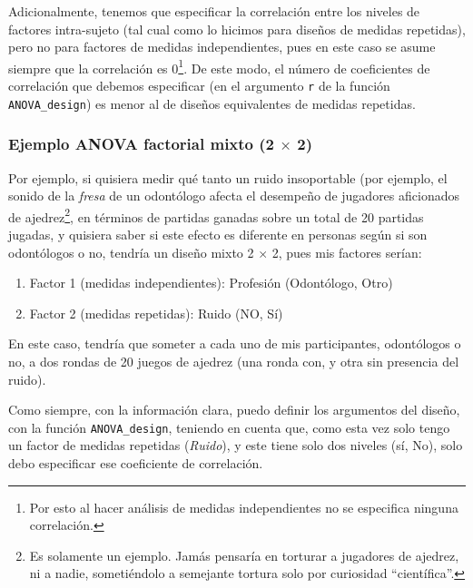 \documentclass[
]{article}
\providecommand{\tightlist}{%
  \setlength{\itemsep}{0pt}\setlength{\parskip}{0pt}}
\begin{document}
Adicionalmente, tenemos que especificar la correlación entre los niveles
de factores intra-sujeto (tal cual como lo hicimos para diseños de
medidas repetidas), pero no para factores de medidas independientes,
pues en este caso se asume siempre que la correlación es 0\footnote{Por
  esto al hacer análisis de medidas independientes no se especifica
  ninguna correlación.}. De este modo, el número de coeficientes de
correlación que debemos especificar (en el argumento \texttt{r} de la
función \texttt{ANOVA\_design}) es menor al de diseños equivalentes de
medidas repetidas.

\hypertarget{ejemplo-anova-factorial-mixto-2-times-2}{%
\subsubsection{\texorpdfstring{Ejemplo ANOVA factorial mixto (2
\(\times\)
2)}{Ejemplo ANOVA factorial mixto (2 \textbackslash times 2)}}\label{ejemplo-anova-factorial-mixto-2-times-2}}

Por ejemplo, si quisiera medir qué tanto un ruido insoportable (por
ejemplo, el sonido de la \emph{fresa} de un odontólogo afecta el
desempeño de jugadores aficionados de ajedrez\footnote{Es solamente un
  ejemplo. Jamás pensaría en torturar a jugadores de ajedrez, ni a
  nadie, sometiéndolo a semejante tortura solo por curiosidad
  ``científica''.}, en términos de partidas ganadas sobre un total de 20
partidas jugadas, y quisiera saber si este efecto es diferente en
personas según si son odontólogos o no, tendría un diseño mixto 2
\(\times\) 2, pues mis factores serían:

\begin{enumerate}
\def\labelenumi{\arabic{enumi}.}
\tightlist
\item
  Factor 1 (medidas independientes): Profesión (Odontólogo, Otro)
\item
  Factor 2 (medidas repetidas): Ruido (NO, Sí)
\end{enumerate}

En este caso, tendría que someter a cada uno de mis participantes,
odontólogos o no, a dos rondas de 20 juegos de ajedrez (una ronda con, y
otra sin presencia del ruido).

Como siempre, con la información clara, puedo definir los argumentos del
diseño, con la función \texttt{ANOVA\_design}, teniendo en cuenta que,
como esta vez solo tengo un factor de medidas repetidas (\emph{Ruido}),
y este tiene solo dos niveles (sí, No), solo debo especificar ese
coeficiente de correlación.
\end{document}
